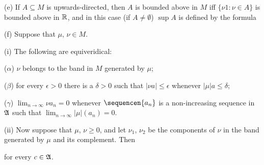 (e) If $A\subseteq M$ is upwards-directed, then $A$ is bounded above in
$M$ iff $\{\nu 1:\nu\in A\}$ is bounded above in $\Bbb R$, and in this
case (if $A\ne\emptyset$) $\sup A$ is defined by the formula



(f) Suppose that $\mu$, $\nu\in M$.

\quad(i) The following are equiveridical:

\qquad($\alpha$) $\nu$ belongs to the band in $M$ generated by $\mu$;

\qquad ($\beta$) for every $\epsilon>0$ there is a $\delta>0$ such that
$|\nu a|\le\epsilon$ whenever $|\mu|a\le\delta$;

\qquad ($\gamma$) $\lim_{n\to\infty}\nu a_n=0$ whenever
$\sequencen{a_n}$ is a non-increasing sequence in $\frak A$ such that
$\lim_{n\to\infty}|\mu|(a_n)=0$.

\quad(ii) Now suppose that $\mu$, $\nu\ge 0$, and let $\nu_1$, $\nu_2$
be the components of $\nu$ in the band generated by $\mu$ and its
complement.   Then


\noindent for every $c\in\frak A$.

